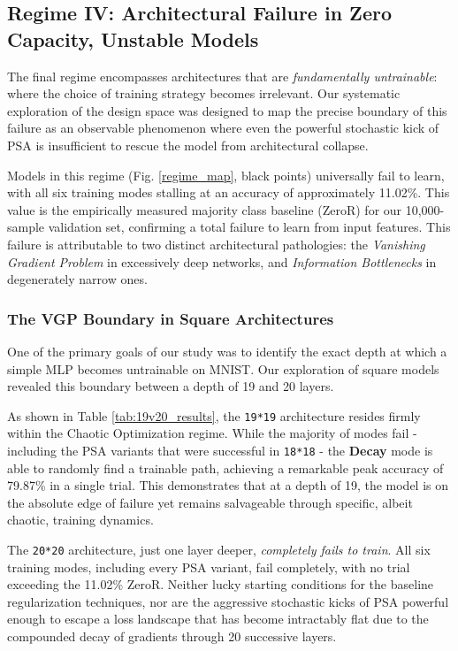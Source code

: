 \documentclass[conference]{IEEEtran}
\begin{document}
\subsection{Regime IV: Architectural Failure in Zero Capacity, Unstable Models}

The final regime encompasses architectures that are \textit{fundamentally untrainable}: where the choice of training strategy becomes irrelevant. Our systematic exploration of the design space was designed to map the precise boundary of this failure as an observable phenomenon where even the powerful stochastic kick of PSA is insufficient to rescue the model from architectural collapse.

Models in this regime (Fig. \ref{regime_map}, black points) universally fail to learn, with all six training modes stalling at an accuracy of approximately 11.02\%. This value is the empirically measured majority class baseline (ZeroR) for our 10,000-sample validation set, confirming a total failure to learn from input features. This failure is attributable to two distinct architectural pathologies: the \textit{Vanishing Gradient Problem} in excessively deep networks, and \textit{Information Bottlenecks} in degenerately narrow ones.

\subsubsection{The VGP Boundary in Square Architectures}

One of the primary goals of our study was to identify the exact depth at which a simple MLP becomes untrainable on MNIST. Our exploration of square models revealed this boundary between a depth of 19 and 20 layers.

As shown in Table \ref{tab:19v20_results}, the \texttt{19*19} architecture resides firmly within the Chaotic Optimization regime. While the majority of modes fail - including the PSA variants that were successful in \verb|18*18| - the \textbf{Decay} mode is able to randomly find a trainable path, achieving a remarkable peak accuracy of 79.87\% in a single trial. This demonstrates that at a depth of 19, the model is on the absolute edge of failure yet remains salvageable through specific, albeit chaotic, training dynamics.

The \texttt{20*20} architecture, just one layer deeper, \textit{completely fails to train}. All six training modes, including every PSA variant, fail completely, with no trial exceeding the 11.02\% ZeroR. Neither lucky starting conditions for the baseline regularization techniques, nor are the aggressive stochastic kicks of PSA powerful enough to escape a loss landscape that has become intractably flat due to the compounded decay of gradients through 20 successive layers.
\end{document}
